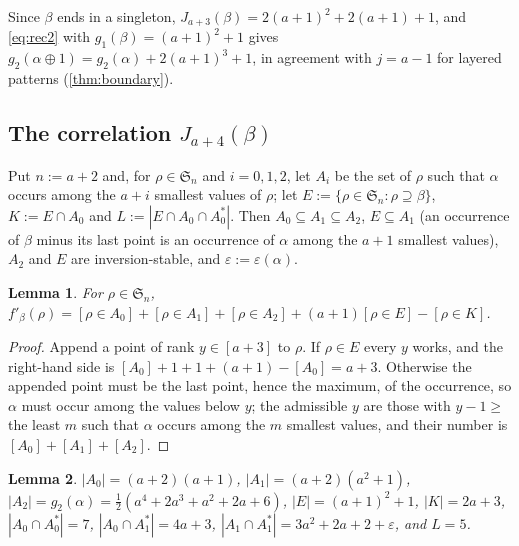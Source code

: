 \documentclass[11pt,reqno]{amsart}
\theoremstyle{plain}
\newtheorem{lemma}[lemma]{Lemma}
\theoremstyle{definition}
\theoremstyle{remark}
\newcommand{\bb}[1]{\left[#1\right]}
\newcommand{\Sym}{\mathfrak{S}}
\begin{document}
Since $\beta$ ends in a singleton, $J_{a+3}(\beta)=2(a+1)^2+2(a+1)+1$, and \eqref{eq:rec2} with $g_1(\beta)=(a+1)^2+1$ gives $g_2(\alpha\oplus1)=g_2(\alpha)+2(a+1)^3+1$, in agreement with $j=a-1$ for layered patterns (\cref{thm:boundary}).

\subsection{The correlation \texorpdfstring{$J_{a+4}(\beta)$}{J(a+4)}}
Put $n:=a+2$ and, for $\rho\in\Sym_n$ and $i=0,1,2$, let $A_i$ be the set of $\rho$ such that $\alpha$ occurs among the $a+i$ smallest values of $\rho$; let $E:=\{\rho\in\Sym_n:\rho\supseteq\beta\}$, $K:=E\cap A_0$ and $L:=|E\cap A_0\cap A_0^*|$. Then $A_0\subseteq A_1\subseteq A_2$, $E\subseteq A_1$ (an occurrence of $\beta$ minus its last point is an occurrence of $\alpha$ among the $a+1$ smallest values), $A_2$ and $E$ are inversion-stable, and $\varepsilon:=\varepsilon(\alpha)$.

\begin{lemma}\label{lem:f3}
For $\rho\in\Sym_n$, $f'_\beta(\rho)=\bb{\rho\in A_0}+\bb{\rho\in A_1}+\bb{\rho\in A_2}+(a+1)\bb{\rho\in E}-\bb{\rho\in K}$.
\end{lemma}

\begin{proof}
Append a point of rank $y\in[a+3]$ to $\rho$. If $\rho\in E$ every $y$ works, and the right-hand side is $\bb{A_0}+1+1+(a+1)-\bb{A_0}=a+3$. Otherwise the appended point must be the last point, hence the maximum, of the occurrence, so $\alpha$ must occur among the values below $y$; the admissible $y$ are those with $y-1\ge$ the least $m$ such that $\alpha$ occurs among the $m$ smallest values, and their number is $\bb{A_0}+\bb{A_1}+\bb{A_2}$.
\end{proof}

\begin{lemma}\label{lem:table}
$|A_0|=(a+2)(a+1)$, $|A_1|=(a+2)(a^2+1)$, $|A_2|=g_2(\alpha)=\tfrac12(a^4+2a^3+a^2+2a+6)$, $|E|=(a+1)^2+1$, $|K|=2a+3$, $|A_0\cap A_0^*|=7$, $|A_0\cap A_1^*|=4a+3$, $|A_1\cap A_1^*|=3a^2+2a+2+\varepsilon$, and $L=5$.
\end{lemma}
\end{document}
